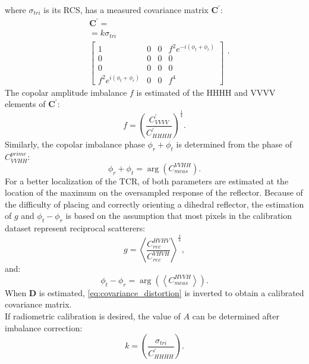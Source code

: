 where $\sigma_{tri}$ is its RCS, has a measured covariance matrix $\mathbf{C^{\prime}}$:
\begin{equation}
	\begin{aligned}
	&\mathbf{C^{\prime}} =\\
	&= k \sigma_{tri}\\
	&\begin{bmatrix}
		1 & 0 & 0 & f^2 e^{-i \left(\phi_t + \phi_r\right)}\\
		0 & 0 & 0 & 0\\
		0 & 0 & 0 & 0\\
		f^2 e^{i \left(\phi_t + \phi_r\right)} & 0 & 0 & f^4
	\end{bmatrix}
	\end{aligned}.
\end{equation}
The copolar amplitude imbalance $f$ is estimated of the HHHH and VVVV elements of $\mathbf{C^{\prime}}$:
\begin{equation}
	f = \left(\frac{C^{\prime}_{VVVV}}{C^{\prime}_{HHHH}}\right)^{\frac{1}{4}}.
\end{equation}
Similarly, the copolar imbalance phase $\phi_r + \phi_t$ is determined from the phase of $C_{VVHH}^{prime}$:
\begin{equation}
	\phi_r + \phi_t = \operatorname{arg}\left(C_{meas}^{VVHH}\right).
\end{equation}
For a better localization of the TCR, of both parameters are estimated at the location of the maximum on the oversampled response of the reflector.
Because of the difficulty of placing and correctly orienting a dihedral reflector, the estimation of $g$ and $\phi_t - \phi_r$ is based on the assumption that most pixels in the calibration dataset represent reciprocal scatterers:
\begin{equation}
	g = \left<\frac{C_{rec}^{HVHV}}{C_{rec}^{VHVH}}\right>^\frac{1}{4},
\end{equation}
and:
\begin{equation}
	\phi_t - \phi_r =\operatorname{arg}\left( \left<C_{meas}^{HVVH}\right>\right).
\end{equation}
When $\mathbf{D}$ is estimated, \autoref{eq:covariance_distortion} is inverted to obtain a calibrated covariance matrix.\\
If radiometric calibration is desired, the value of $A$ can be determined after imbalance correction:
\begin{equation}
	k =	\left(\frac{\sigma_{tri}}{C^{\prime}_{HHHH}}\right).
\end{equation}
